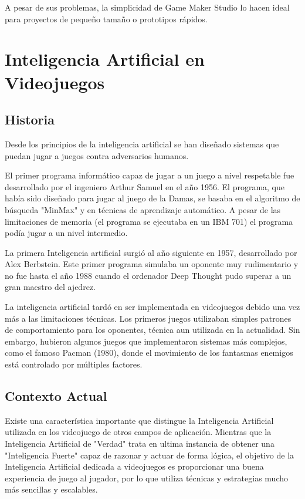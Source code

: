 A pesar de sus problemas, la simplicidad de Game Maker Studio lo hacen ideal para proyectos de pequeño tamaño o prototipos rápidos.

\section{Inteligencia Artificial en Videojuegos}
\subsection{Historia}
Desde los principios de la inteligencia artificial se han diseñado sistemas que puedan jugar a juegos contra adversarios humanos. 

El primer programa informático capaz de jugar a un juego a nivel respetable fue desarrollado por el ingeniero Arthur Samuel en el año 1956. El programa, que había sido diseñado para jugar al juego de la Damas, se basaba en  el algoritmo de búsqueda "MinMax" y en técnicas de aprendizaje automático. A pesar de las limitaciones de memoria (el programa se ejecutaba en un IBM 701) el programa podía jugar a un nivel intermedio.

La primera Inteligencia artificial surgió al año siguiente en 1957, desarrollado por Alex Berbstein. Este primer programa simulaba un oponente muy rudimentario y no fue hasta el año 1988 cuando el ordenador Deep Thought pudo superar a un gran maestro del ajedrez.

La inteligencia artificial tardó en ser implementada en videojuegos debido una vez más a las limitaciones técnicas. Los primeros juegos utilizaban simples patrones de comportamiento para los oponentes, técnica aun utilizada en la actualidad. Sin embargo, hubieron algunos juegos que implementaron sistemas más complejos, como el famoso Pacman (1980), donde el movimiento de los fantasmas enemigos está controlado por múltiples factores.

\subsection{Contexto Actual}
Existe una característica importante que distingue la Inteligencia Artificial utilizada en los videojuego de otros campos de aplicación. Mientras que la Inteligencia Artificial de "Verdad" trata en ultima instancia de obtener una "Inteligencia Fuerte" capaz de razonar y actuar de forma lógica, el objetivo de la Inteligencia Artificial dedicada a videojuegos es proporcionar una buena experiencia de juego al jugador, por lo que utiliza técnicas y estrategias mucho más sencillas y escalables.

